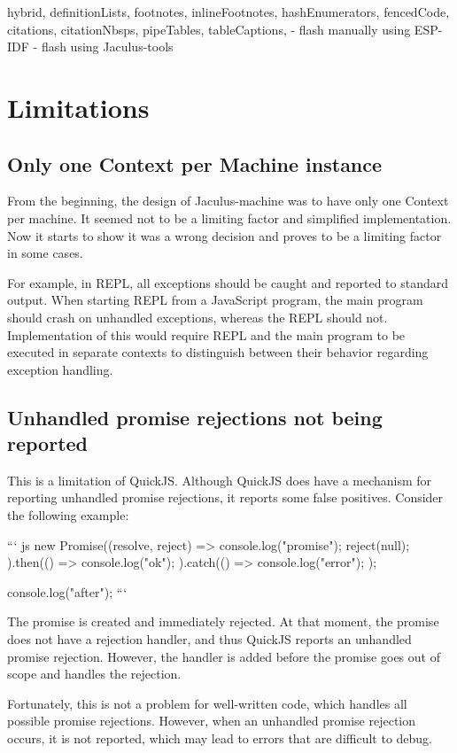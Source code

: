 \documentclass[
  digital,
  oneside,
  nosansbold,
  nocolorbold,
  lof,
  lot
]{fithesis4}
\begin{document}
\begin{markdown*}{%
  hybrid,
  definitionLists,
  footnotes,
  inlineFootnotes,
  hashEnumerators,
  fencedCode,
  citations,
  citationNbsps,
  pipeTables,
  tableCaptions,
}
  - flash manually using ESP-IDF
  - flash using Jaculus-tools


\chapter{Limitations}

\section{Only one Context per Machine instance}

From the beginning, the design of Jaculus-machine was to have only one Context per machine. It seemed not to be a limiting factor and simplified implementation. Now it starts to show it was a wrong decision and proves to be a limiting factor in some cases.

For example, in REPL, all exceptions should be caught and reported to standard output. When starting REPL from a JavaScript program, the main program should crash on unhandled exceptions, whereas the REPL should not. Implementation of this would require REPL and the main program to be executed in separate contexts to distinguish between their behavior regarding exception handling.


\section{Unhandled promise rejections not being reported}

This is a limitation of QuickJS. Although QuickJS does have a mechanism for reporting unhandled promise rejections, it reports some false positives. Consider the following example:

``` js
new Promise((resolve, reject) => {
    console.log("promise");
    reject(null);
}).then(() => {
    console.log("ok");
}).catch(() => {
    console.log("error");
});

console.log("after");
```

The promise is created and immediately rejected. At that moment, the promise does not have a rejection handler, and thus QuickJS reports an unhandled promise rejection. However, the handler is added before the promise goes out of scope and handles the rejection.

Fortunately, this is not a problem for well-written code, which handles all possible promise rejections. However, when an unhandled promise rejection occurs, it is not reported, which may lead to errors that are difficult to debug.


\end{markdown*}
\end{document}
